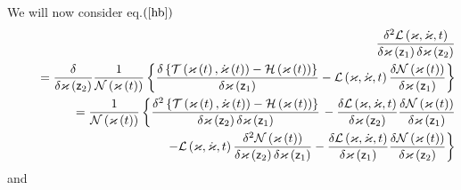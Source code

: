 We will now consider eq.$\left( \ref{hb}\right) $%
\begin{eqnarray}
&&\frac{\delta ^{2}{\cal L}\left( {\cal \varkappa },{\cal \dot{\varkappa}}%
,t\right) }{\delta \varkappa \left( {\sf z}_{1}\right) \delta \varkappa
\left( {\sf z}_{2}\right) }  \nonumber \\
&&\left. {}\right. =\frac{\delta }{\delta \varkappa \left( {\sf z}%
_{2}\right) }\frac{1}{{\cal N}\left( {\cal \varkappa }\left( t\right)
\right) }\left\{ \frac{\delta \left\{ {\cal T}\left( {\cal \varkappa }\left(
t\right) ,{\cal \dot{\varkappa}}\left( t\right) \right) -{\cal H}\left( 
{\cal \varkappa }\left( t\right) \right) \right\} }{\delta {\cal \varkappa }%
\left( {\sf z}_{1}\right) }-{\cal L}\left( {\cal \varkappa },{\cal \dot{%
\varkappa}},t\right) \frac{\delta {\cal N}\left( {\cal \varkappa }\left(
t\right) \right) }{\delta {\cal \varkappa }\left( {\sf z}_{1}\right) }%
\right\} \\
&&\left. {}\right. =\frac{1}{{\cal N}\left( {\cal \varkappa }\left( t\right)
\right) }\left\{ \frac{\delta ^{2}\left\{ {\cal T}\left( {\cal \varkappa }%
\left( t\right) ,{\cal \dot{\varkappa}}\left( t\right) \right) -{\cal H}%
\left( {\cal \varkappa }\left( t\right) \right) \right\} }{\delta \varkappa
\left( {\sf z}_{2}\right) \delta {\cal \varkappa }\left( {\sf z}_{1}\right) }%
\right. -\frac{\delta {\cal L}\left( {\cal \varkappa },{\cal \dot{\varkappa}}%
,t\right) }{\delta \varkappa \left( {\sf z}_{2}\right) }\frac{\delta {\cal N}%
\left( {\cal \varkappa }\left( t\right) \right) }{\delta {\cal \varkappa }%
\left( {\sf z}_{1}\right) }  \nonumber \\
&&\qquad \qquad \qquad \qquad \qquad \qquad \left. -{\cal L}\left( {\cal %
\varkappa },{\cal \dot{\varkappa}},t\right) \frac{\delta ^{2}{\cal N}\left( 
{\cal \varkappa }\left( t\right) \right) }{\delta \varkappa \left( {\sf z}%
_{2}\right) \delta {\cal \varkappa }\left( {\sf z}_{1}\right) }-\frac{\delta 
{\cal L}\left( {\cal \varkappa },{\cal \dot{\varkappa}},t\right) }{\delta
\varkappa \left( {\sf z}_{1}\right) }\frac{\delta {\cal N}\left( {\cal %
\varkappa }\left( t\right) \right) }{\delta {\cal \varkappa }\left( {\sf z}%
_{2}\right) }\right\}  \label{hb1}
\end{eqnarray}%
and 
